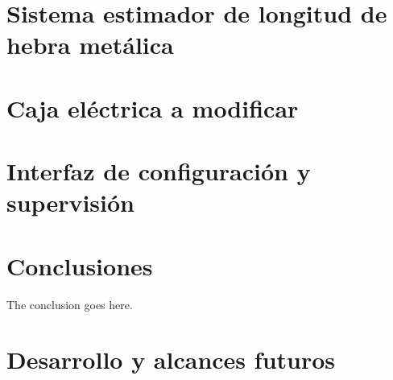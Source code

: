 \documentclass[conference]{IEEEtran}
\begin{document}
\section{Sistema estimador de longitud de hebra metálica}



\section{Caja eléctrica a modificar}



\section{Interfaz de configuración y supervisión}



\section{Conclusiones}

The conclusion goes here.



\section{Desarrollo y alcances futuros}


\end{document}

